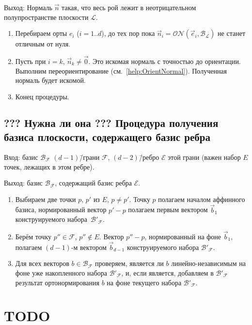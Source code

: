 \documentclass[a4paper,12pt]{article}
\newcommand{\Facet}{\mathcal{F}}              %
\newcommand{\Edge}{\mathcal{E}}               %
\newcommand{\Basis}{\mathcal{B}}              %
\newcommand{\ZVec}{\vec 0}                    %
\newcommand{\ONorm}[3][]{\mathcal{ON}#1( #2, #3 #1)} %
\newcommand{\Plane}{\mathcal{L}}           %
\renewcommand{\.}{\hspace{0.2ex}}
\begin{document}
    Выход: Нормаль $\vec n$ такая, что весь рой лежит в неотрицательном полупространстве плоскости $\Plane$.

    \begin{enumerate}
      \item Перебираем орты $e_i$ ($i=1..d$), до тех пор пока $\vec n_i = \ONorm{\vec e_i}{\Basis_\Plane}$ не станет отличным от нуля.

      \item Пусть при $i = k$, $\vec n_k \neq \ZVec$. Это искомая нормаль с точностью до ориентации. Выполним переориентирование (см.~\ref{help:OrientNormal}). Полученная нормаль будет искомой.

      \item Конец процедуры.
    \end{enumerate}




  \subsection{??? Нужна ли она ??? Процедура получения базиса плоскости, содержащего базис ребра}
    \label{help:BuildFaceBasisBasedOnEdge}
    Вход: базис $\Basis_{\Facet}$ $(d-1)$\=/грани $\Facet$, $(d-2)$\=/ребро $\Edge$ этой грани (важен набор $E$ точек, лежащих в этом ребре).

    Выход: базис $\Basis_{\Facet}$, содержащий базис ребра $\Edge$.
    \begin{enumerate}
      \item Выбираем две точки $p$, $p'$ из $E$, $p \neq p'$. Точку $p$ полагаем началом аффинного базиса, нормированный вектор $p'-p$ полагаем первым вектором $\vec b_1$ конструируемого набора~$\Basis'_{\Facet}$.
      \item Берём точку $p'' \in \Facet$, $p'' \notin E$. Вектор $p''-p$, нормированный на фоне $\vec b_1$, полагаем $(d-1)$-м вектором $\vec b_{d-1}$ конструируемого набора $\Basis'_{\Facet}$.
      \item Для всех векторов $b \in \Basis_{\Facet}$ проверяем, является ли $b$ линейно-независимым на фоне уже накопленного набора $\Basis'_{\Facet}$, и, если является, добавляем в $\Basis'_{\Facet}$ результат ортонормирования $b$ на фоне текущего набора $\Basis'_{\Facet}$.
    \end{enumerate}


\section{TODO}
\end{document}
